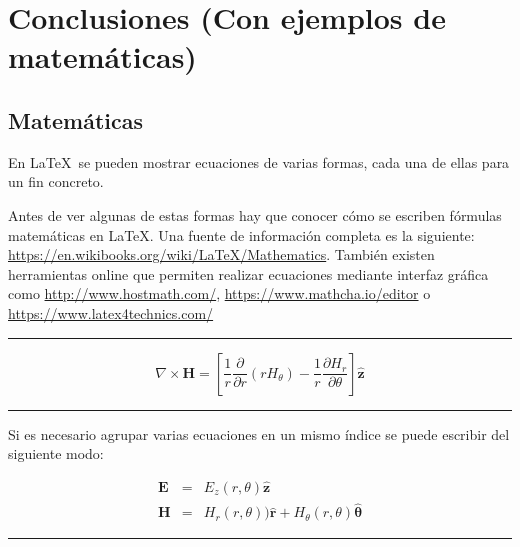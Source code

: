 
\chapter{Conclusiones (Con ejemplos de matemáticas)}
\label{conclusiones}

\section{Matemáticas}

En \LaTeX~se pueden mostrar ecuaciones de varias formas, cada una de ellas para un fin concreto.
\par Antes de ver algunas de estas formas hay que conocer cómo se escriben fórmulas matemáticas en \LaTeX. Una fuente de información completa es la siguiente: \url{https://en.wikibooks.org/wiki/LaTeX/Mathematics}. También existen herramientas online que permiten realizar ecuaciones mediante interfaz gráfica como \url{http://www.hostmath.com/}, \url{https://www.mathcha.io/editor} o \url{https://www.latex4technics.com/}
\vspace{1em}
\noindent\hrule
\vspace{1em}

\begin{equation}
  \nabla\times{\mathbf H}=\left[\frac{1}{r}\frac{\partial}{\partial
        r}(rH_\theta)-\frac{1}{r}\frac{\partial
        H_r}{\partial\theta}\right]{\hat{\mathbf z}}
        \label{ecuacion}
\end{equation}
\vspace{1em}
\noindent\hrule
\vspace{1em}
Si es necesario agrupar varias ecuaciones en un mismo índice se puede escribir del siguiente modo:

\begin{subequations}
  \begin{eqnarray}
    {\mathbf E}&=&E_z(r,\theta)\hat{\mathbf z}\label{ecu1} \\
    {\mathbf H}&=&H_r(r,\theta))\hat{ \mathbf r}+H_\theta(r,\theta)\hat{\bm
      \theta}\label{ecu2}
  \end{eqnarray}
\end{subequations}
\vspace{1em}
\noindent\hrule
\vspace{1em}

